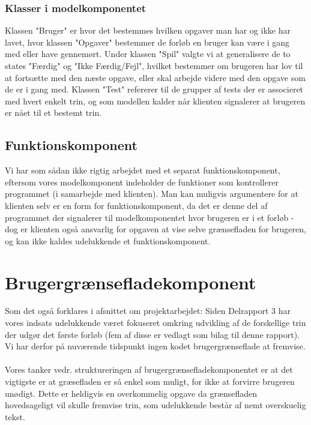 \documentclass[10pt,a4paper,danish]{article}
\begin{document}
\subsubsection{Klasser i modelkomponentet}
Klassen "Bruger" er hvor det bestemmes hvilken opgaver man har og ikke har
lavet, hvor klassen "Opgaver" bestemmer de forløb en bruger kan være i gang med
eller have gennemørt. Under klassen "Spil" valgte 
vi at generalisere de to states "Færdig" og "Ikke Færdig/Fejl", hvilket bestemmer om brugeren 
har lov til at fortsætte med den næste opgave, eller skal arbejde videre med den 
opgave som de er i gang med. Klassen "Test" refererer til de grupper af tests
der er associeret med hvert enkelt trin, og som modellen kalder når klienten 
signalerer at brugeren er nået til et bestemt trin.  

\subsection{Funktionskomponent}
Vi har som sådan ikke rigtig arbejdet med et separat funktionskomponent, eftersom vores
modelkomponent indeholder de funktioner som kontrollerer programmet (i 
samarbejde med klienten). Man kan muligvis argumentere for at klienten selv 
er en form for funktionskomponent, da det er denne del af programmet der 
signalerer til modelkomponentet hvor brugeren er i et forløb - dog er 
klienten også ansvarlig for opgaven at vise selve grænsefladen for brugeren, og
kan ikke kaldes udelukkende et funktionskomponent. 

\section{Brugergrænsefladekomponent}
Som det også forklares i afsnittet om projektarbejdet: Siden Delrapport 3 har vores 
indsats udelukkende været fokuseret omkring udvikling af de forskellige trin der udgør
det første forløb (fem af disse er vedlagt som bilag til denne rapport). Vi har derfor
på nuværende tidspunkt ingen kodet brugergrænseflade at fremvise. 

\paragraph{}
Vores tanker vedr. struktureringen af brugergrænsefladekomponentet er at det vigtigste
er at græsefladen er så enkel som muligt, for ikke at forvirre brugeren unødigt. Dette
er heldigvis en overkommelig opgave da grænsefladen hovedsageligt vil skulle fremvise
trin, som udelukkende består af nemt overskuelig tekst. 
\end{document}
